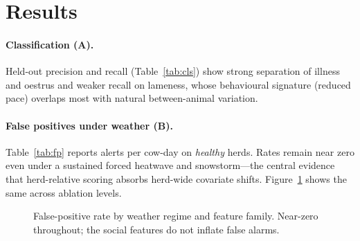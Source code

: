 \documentclass[11pt]{article}
\begin{document}
\section{Results}
\label{sec:results}

\paragraph{Classification (A).} Held-out precision and recall
(Table~\ref{tab:cls}) show strong separation of illness and oestrus and weaker
recall on lameness, whose behavioural signature (reduced pace) overlaps most with
natural between-animal variation.

\begin{table}[t]\centering
\caption{Held-out classification, full model. Mean over \numreplicates{}
replicates (\%).}
\label{tab:cls}

\end{table}

\paragraph{False positives under weather (B).} Table~\ref{tab:fp} reports alerts
per cow-day on \emph{healthy} herds. Rates remain near zero even under a
sustained forced heatwave and snowstorm---the central evidence that
herd-relative scoring absorbs herd-wide covariate shifts. Figure~\ref{fig:fp}
shows the same across ablation levels.

\begin{table}[t]\centering
\caption{False alerts per cow-day on healthy herds (mean\,$\pm$\,95\% CI), by
weather regime and feature family.}
\label{tab:fp}

\end{table}

\begin{figure}[t]\centering
{}
\caption{False-positive rate by weather regime and feature family. Near-zero
throughout; the social features do not inflate false alarms.}
\label{fig:fp}
\end{figure}
\end{document}
